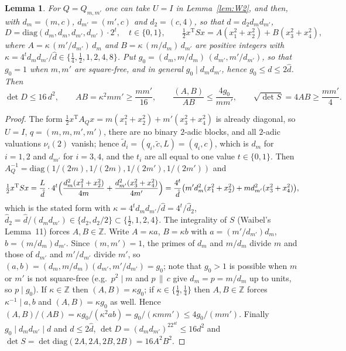 \documentclass[11pt]{amsart}
\newtheorem{lemma}[theorem]{Lemma}
\theoremstyle{remark}
\newcommand{\Z}{\mathbb{Z}}
\begin{document}
\begin{lemma}\label{lem:S}
For $Q=Q_{m,m'}$ one can take $U=I$ in Lemma~\ref{lem:W2}, and then, with $d_m=(m,c)$, $d_{m'}=(m',c)$ and $d_2=(c,4)$, so that $d=d_2d_md_{m'}$,
\[
D=\mathrm{diag}(d_m,d_m,d_{m'},d_{m'})\cdot2^{t},\quad t\in\{0,1\},\qquad
\tfrac12x^{\mathrm T}Sx=A(x_1^2+x_2^2)+B(x_3^2+x_4^2),
\]
where $A=\kappa\,(m'/d_{m'})\,d_m$ and $B=\kappa\,(m/d_m)\,d_{m'}$ are positive integers with $\kappa=4^{t}d_md_{m'}/\hat d\in\{\tfrac14,\tfrac12,1,2,4,8\}$. Put $g_0=(d_m,m/d_m)\,(d_{m'},m'/d_{m'})$, so that $g_0=1$ when $m,m'$ are square-free, and in general $g_0\mid d_md_{m'}$, hence $g_0\le d\le2\hat d$. Then
\[
\det D\le16\,d^2,\qquad AB=\kappa^2mm'\ge\frac{mm'}{16},\qquad \frac{(A,B)}{AB}\le\frac{4g_0}{mm'},\qquad \sqrt{\det S}=4AB\ge\frac{mm'}4 .
\]
\end{lemma}
\begin{proof}
The form $\tfrac12x^{\mathrm T}A_Qx=m(x_1^2+x_2^2)+m'(x_3^2+x_4^2)$ is already diagonal, so $U=I$, $q=(m,m,m',m')$, there are no binary $2$-adic blocks, and all $2$-adic valuations $\nu_i(2)$ vanish; hence $\tilde d_i=(q_i,\tilde c,L)=(q_i,c)$, which is $d_m$ for $i=1,2$ and $d_{m'}$ for $i=3,4$, and the $t_i$ are all equal to one value $t\in\{0,1\}$. Then $A_Q^{-1}=\mathrm{diag}(1/(2m),1/(2m),1/(2m'),1/(2m'))$ and
\[
\tfrac12x^{\mathrm T}Sx=\frac{L}{\hat d}\cdot4^{t}\Bigl(\frac{d_m^2(x_1^2+x_2^2)}{4m}+\frac{d_{m'}^2(x_3^2+x_4^2)}{4m'}\Bigr)
=\frac{4^{t}}{\hat d}\bigl(m'd_m^2(x_1^2+x_2^2)+md_{m'}^2(x_3^2+x_4^2)\bigr),
\]
which is the stated form with $\kappa=4^td_md_{m'}/\hat d=4^t/\hat d_2$, $\hat d_2=\hat d/(d_md_{m'})\in\{d_2,d_2/2\}\subset\{\tfrac12,1,2,4\}$. The integrality of $S$ (Waibel's Lemma~11) forces $A,B\in\Z$. Write $A=\kappa a$, $B=\kappa b$ with $a=(m'/d_{m'})d_m$, $b=(m/d_m)d_{m'}$. Since $(m,m')=1$, the primes of $d_m$ and $m/d_m$ divide $m$ and those of $d_{m'}$ and $m'/d_{m'}$ divide $m'$, so $(a,b)=(d_m,m/d_m)(d_{m'},m'/d_{m'})=g_0$; note that $g_0>1$ is possible when $m$ or $m'$ is not square-free (e.g.\ $p^2\mid m$ and $p\,\|\,c$ give $d_m=p=m/d_m$ up to units, so $p\mid g_0$). If $\kappa\in\Z$ then $(A,B)=\kappa g_0$; if $\kappa\in\{\frac12,\frac14\}$ then $A,B\in\Z$ forces $\kappa^{-1}\mid a,b$ and $(A,B)=\kappa g_0$ as well. Hence $(A,B)/(AB)=\kappa g_0/(\kappa^2ab)=g_0/(\kappa mm')\le4g_0/(mm')$. Finally $g_0\mid d_md_{m'}\mid d$ and $d\le2\hat d$, $\det D=(d_md_{m'})^22^{4t}\le16d^2$ and $\det S=\det\mathrm{diag}(2A,2A,2B,2B)=16A^2B^2$.
\end{proof}
\end{document}
